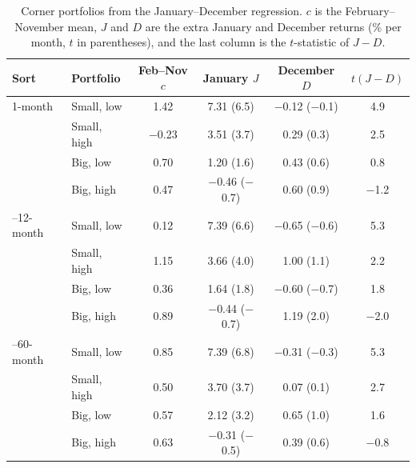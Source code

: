 \begin{table}[H]
\centering\small
\caption{Corner portfolios from the January--December regression. $c$ is the February--November mean, $J$ and $D$ are the extra January and December returns (\% per month, $t$ in parentheses), and the last column is the $t$-statistic of $J-D$.}
\label{tab:corners}
\begin{tabular}{llcccc}
\toprule
Sort & Portfolio & Feb--Nov $c$ & January $J$ & December $D$ & $t(J-D)$ \\
\midrule
1-month & Small, low & 1.42 & 7.31 (6.5) & $-$0.12 ($-$0.1) & 4.9 \\
 & Small, high & $-$0.23 & 3.51 (3.7) & 0.29 (0.3) & 2.5 \\
 & Big, low & 0.70 & 1.20 (1.6) & 0.43 (0.6) & 0.8 \\
 & Big, high & 0.47 & $-$0.46 ($-$0.7) & 0.60 (0.9) & $-$1.2 \\
\addlinespace
2--12-month & Small, low & 0.12 & 7.39 (6.6) & $-$0.65 ($-$0.6) & 5.3 \\
 & Small, high & 1.15 & 3.66 (4.0) & 1.00 (1.1) & 2.2 \\
 & Big, low & 0.36 & 1.64 (1.8) & $-$0.60 ($-$0.7) & 1.8 \\
 & Big, high & 0.89 & $-$0.44 ($-$0.7) & 1.19 (2.0) & $-$2.0 \\
\addlinespace
13--60-month & Small, low & 0.85 & 7.39 (6.8) & $-$0.31 ($-$0.3) & 5.3 \\
 & Small, high & 0.50 & 3.70 (3.7) & 0.07 (0.1) & 2.7 \\
 & Big, low & 0.57 & 2.12 (3.2) & 0.65 (1.0) & 1.6 \\
 & Big, high & 0.63 & $-$0.31 ($-$0.5) & 0.39 (0.6) & $-$0.8 \\
\bottomrule
\end{tabular}
\end{table}

